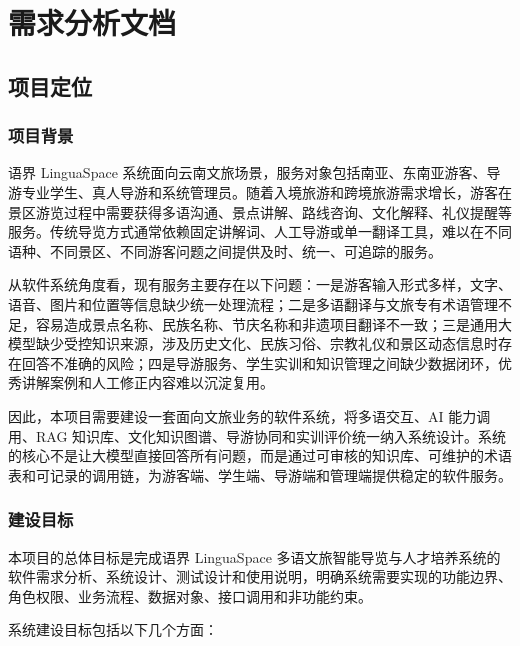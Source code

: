 \chapter{需求分析文档}

\section{项目定位}

\subsection{项目背景}

语界 LinguaSpace 系统面向云南文旅场景，服务对象包括南亚、东南亚游客、导游专业学生、真人导游和系统管理员。随着入境旅游和跨境旅游需求增长，游客在景区游览过程中需要获得多语沟通、景点讲解、路线咨询、文化解释、礼仪提醒等服务。传统导览方式通常依赖固定讲解词、人工导游或单一翻译工具，难以在不同语种、不同景区、不同游客问题之间提供及时、统一、可追踪的服务。

从软件系统角度看，现有服务主要存在以下问题：一是游客输入形式多样，文字、语音、图片和位置等信息缺少统一处理流程；二是多语翻译与文旅专有术语管理不足，容易造成景点名称、民族名称、节庆名称和非遗项目翻译不一致；三是通用大模型缺少受控知识来源，涉及历史文化、民族习俗、宗教礼仪和景区动态信息时存在回答不准确的风险；四是导游服务、学生实训和知识管理之间缺少数据闭环，优秀讲解案例和人工修正内容难以沉淀复用。

因此，本项目需要建设一套面向文旅业务的软件系统，将多语交互、AI 能力调用、RAG 知识库、文化知识图谱、导游协同和实训评价统一纳入系统设计。系统的核心不是让大模型直接回答所有问题，而是通过可审核的知识库、可维护的术语表和可记录的调用链，为游客端、学生端、导游端和管理端提供稳定的软件服务。

\subsection{建设目标}

本项目的总体目标是完成语界 LinguaSpace 多语文旅智能导览与人才培养系统的软件需求分析、系统设计、测试设计和使用说明，明确系统需要实现的功能边界、角色权限、业务流程、数据对象、接口调用和非功能约束。

系统建设目标包括以下几个方面：

